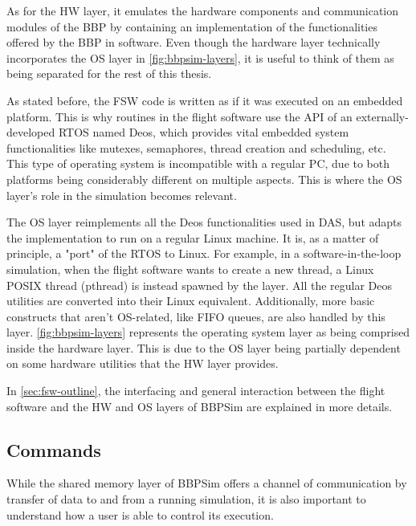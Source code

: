 {As for the HW layer, it emulates the hardware components and communication modules of the BBP by containing an implementation of the functionalities offered by the BBP in software. Even though the hardware layer technically incorporates the OS layer in \autoref{fig:bbpsim-layers}, it is useful to think of them as being separated for the rest of this thesis.

As stated before, the FSW code is written as if it was executed on an embedded platform. This is why routines in the flight software use the API of an externally-developed \gls{RTOS} named Deos, which provides vital embedded system functionalities like mutexes, semaphores, thread creation and scheduling, etc. This type of operating system is incompatible with a regular PC, due to both platforms being considerably different on multiple aspects. This is where the OS layer's role in the simulation becomes relevant. 

The OS layer reimplements all the Deos functionalities used in DAS, but adapts the implementation to run on a regular Linux machine. It is, as a matter of principle, a "port" of the RTOS to Linux. For example, in a software-in-the-loop simulation, when the flight software wants to create a new thread, a Linux POSIX thread (pthread) is instead spawned by the layer. All the regular Deos utilities are converted into their Linux equivalent. Additionally, more basic constructs that aren't OS-related, like FIFO queues, are also handled by this layer. \autoref{fig:bbpsim-layers} represents the operating system layer as being comprised inside the hardware layer. This is due to the OS layer being partially dependent on some hardware utilities that the HW layer provides.

In \autoref{sec:fsw-outline}, the interfacing and general interaction between the flight software and the HW and OS layers of BBPSim are explained in more details.

\subsection*{Commands}
While the shared memory layer of BBPSim offers a channel of communication by transfer of data to and from a running simulation, it is also important to understand how a user is able to control its execution. 

}
